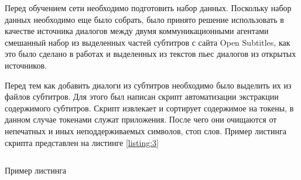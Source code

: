 Перед обучением сети необходимо подготовить набор данных. Поскольку набор данных необходимо еще было собрать, было принято решение использовать в качестве источника диалогов между двумя коммуникационными агентами смешанный набор из выделенных частей субтитров с сайта Open Subtitles, как это было сделано в работах \cite{creutz2018open, arcan2016asistent} и выделенных из текстов пьес диалогов из открытых источников. 

Перед тем как добавить диалоги из субтитров необходимо было выделить их из файлов субтитров. Для этого был написан скрипт автоматизации экстракции содержимого субтитров. Скрипт извлекает и сортирует содержимое на токены, в данном случае токенами служат приложения. После чего они очищаются от непечатных и иных неподдерживаемых символов, стоп слов. Пример листинга скрипта представлен на листинге \ref{listing:3} 

\begin{listing}
\inputminted[breaklines, breakanywhere, linenos, fontsize=\small]{python}{source/prepare_subtitles.py}
\caption{Пример листинга}
\label{listing:3}
\end{listing}

